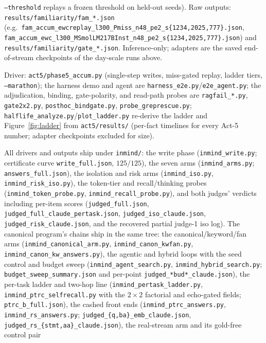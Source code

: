 \documentclass[11pt]{article}
\begin{document}
\begin{description}
\texttt{--threshold} replays a frozen threshold on held-out seeds). Raw outputs:
\texttt{results/familiarity/fam\_*.json} (e.g.\
\texttt{fam\_accum\_ewcreplay\_l300\_Pmiss\_n48\_pe2\_s\{1234,2025,777\}.json},
\texttt{fam\_accum\_ewc\_l300\_MSmolLM217BInst\_n48\_pe2\_s\{1234,2025,777\}.json}) and
\texttt{results/familiarity/gate\_*.json}. Inference-only; adapters are the saved end-of-stream
checkpoints of the day-scale runs above.
\item[Act 5.] Driver: \texttt{act5/phase5\_accum.py} (single-step writes, miss-gated replay,
ladder tiers, \texttt{--marathon}); the harness demo and agent are
\texttt{harness\_e2e.py}/\texttt{e2e\_agent.py}; the adjudication, binding, gate-polarity, and
read-path probes are \texttt{ragfail\_*.py}, \texttt{gate2x2.py}, \texttt{posthoc\_bindgate.py},
\texttt{probe\_greprescue.py}; \texttt{halflife\_analyze.py}/\texttt{plot\_ladder.py} re-derive
the ladder and Figure~\ref{fig:ladder} from \texttt{act5/results/} (per-fact timelines for
every Act-5 number; adapter checkpoints excluded for size).
\item[External stress test (\S\ref{sec:inmind}).] All drivers and outputs ship under
\texttt{inmind/}: the write phase (\texttt{inmind\_write.py}; certificate curve
\texttt{write\_full.json}, $125/125$), the seven arms (\texttt{inmind\_arms.py};
\texttt{answers\_full.json}), the isolation and risk arms
(\texttt{inmind\_iso.py}, \texttt{inmind\_risk\_iso.py}), the token-tier and recall/thinking
probes (\texttt{inmind\_token\_probe.py}, \texttt{inmind\_recall\_probe.py}), and both judges'
verdicts including per-item scores (\texttt{judged\_full.json},
\texttt{judged\_full\_claude\_pertask.json}, \texttt{judged\_iso\_claude.json},
\texttt{judged\_risk\_claude.json}, and the recovered partial judge-1 iso log). The canonical
program's chains ship in the same tree: the canonical/keyword/fan arms
(\texttt{inmind\_canonical\_arm.py}, \texttt{inmind\_canon\_kwfan.py},
\texttt{inmind\_canon\_kw\_answers.py}), the agentic and hybrid loops with the seed control
and budget sweep (\texttt{inmind\_agent\_search.py}, \texttt{inmind\_hybrid\_search.py};
\texttt{budget\_sweep\_summary.json} and per-point \texttt{judged\_*bud*\_claude.json}), the
per-task ladder and two-hop line (\texttt{inmind\_pertask\_ladder.py},
\texttt{inmind\_ptrc\_selfrecall.py} with the $2{\times}2$ factorial and echo-gated fields;
\texttt{ptrc\_b\_full.json}), the cashed front ends (\texttt{inmind\_ptrc\_answers.py},
\texttt{inmind\_rs\_answers.py}; \texttt{judged\_\{q,ba\}\_emb\_claude.json},
\texttt{judged\_rs\_\{stmt,aa\}\_claude.json}), the real-stream arm and its gold-free control pair

\end{description}
\end{document}
